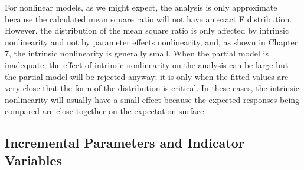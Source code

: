 For nonlinear models, as we might expect, the analysis is only
approximate because the calculated mean square ratio will not have
an exact F distribution.
However, the distribution of the mean square ratio is only
affected by intrinsic nonlinearity and not by parameter effects
nonlinearity,
and, as shown in Chapter 7, the intrinsic nonlinearity is generally small.
When the partial model is inadequate,
the effect of intrinsic nonlinearity on the analysis can be large but the
partial model will be rejected anyway:
it is only when the fitted values are very close that the form of the
distribution is critical.
In these cases, the intrinsic nonlinearity will usually
have a small effect because the expected responses being compared are close
together on the expectation surface.
\subsection{Incremental Parameters and Indicator Variables}

